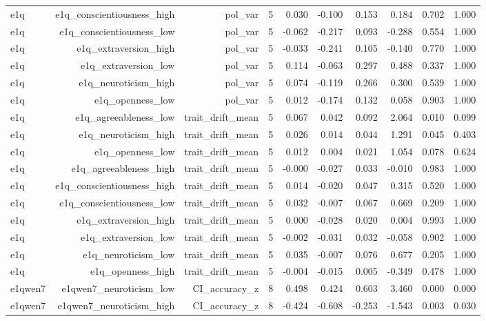 \documentclass[11pt]{article}
\begin{document}
\begin{landscape}
\begin{longtable}{@{}lrrrrrrrrr@{}}
e1q & e1q\_conscientiousness\_high & pol\_var & 5 & 0.030 & -0.100 & 0.153 & 0.184 & 0.702 & 1.000 \\
e1q & e1q\_conscientiousness\_low & pol\_var & 5 & -0.062 & -0.217 & 0.093 & -0.288 & 0.554 & 1.000 \\
e1q & e1q\_extraversion\_high & pol\_var & 5 & -0.033 & -0.241 & 0.105 & -0.140 & 0.770 & 1.000 \\
e1q & e1q\_extraversion\_low & pol\_var & 5 & 0.114 & -0.063 & 0.297 & 0.488 & 0.337 & 1.000 \\
e1q & e1q\_neuroticism\_high & pol\_var & 5 & 0.074 & -0.119 & 0.266 & 0.300 & 0.539 & 1.000 \\
e1q & e1q\_openness\_low & pol\_var & 5 & 0.012 & -0.174 & 0.132 & 0.058 & 0.903 & 1.000 \\
e1q & e1q\_agreeableness\_low & trait\_drift\_mean & 5 & 0.067 & 0.042 & 0.092 & 2.064 & 0.010 & 0.099 \\
e1q & e1q\_neuroticism\_high & trait\_drift\_mean & 5 & 0.026 & 0.014 & 0.044 & 1.291 & 0.045 & 0.403 \\
e1q & e1q\_openness\_low & trait\_drift\_mean & 5 & 0.012 & 0.004 & 0.021 & 1.054 & 0.078 & 0.624 \\
e1q & e1q\_agreeableness\_high & trait\_drift\_mean & 5 & -0.000 & -0.027 & 0.033 & -0.010 & 0.983 & 1.000 \\
e1q & e1q\_conscientiousness\_high & trait\_drift\_mean & 5 & 0.014 & -0.020 & 0.047 & 0.315 & 0.520 & 1.000 \\
e1q & e1q\_conscientiousness\_low & trait\_drift\_mean & 5 & 0.032 & -0.007 & 0.067 & 0.669 & 0.209 & 1.000 \\
e1q & e1q\_extraversion\_high & trait\_drift\_mean & 5 & 0.000 & -0.028 & 0.020 & 0.004 & 0.993 & 1.000 \\
e1q & e1q\_extraversion\_low & trait\_drift\_mean & 5 & -0.002 & -0.031 & 0.032 & -0.058 & 0.902 & 1.000 \\
e1q & e1q\_neuroticism\_low & trait\_drift\_mean & 5 & 0.035 & -0.007 & 0.076 & 0.677 & 0.205 & 1.000 \\
e1q & e1q\_openness\_high & trait\_drift\_mean & 5 & -0.004 & -0.015 & 0.005 & -0.349 & 0.478 & 1.000 \\
e1qwen7 & e1qwen7\_neuroticism\_low & CI\_accuracy\_z & 8 & 0.498 & 0.424 & 0.603 & 3.460 & 0.000 & 0.000 \\
e1qwen7 & e1qwen7\_neuroticism\_high & CI\_accuracy\_z & 8 & -0.424 & -0.608 & -0.253 & -1.543 & 0.003 & 0.030 \\

\end{longtable}
\end{landscape}
\end{document}
